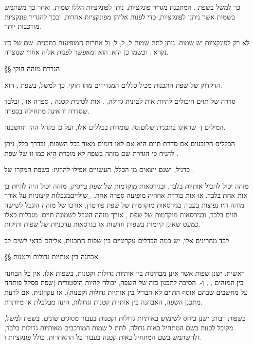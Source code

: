 כך למשל בשפת , המתכנת מגדיר פונקציות, נותן לפונקציות הללו שמות, ואחר כך
משתמש בשמות אשר ניתנו לפונקציות, כדי לפנות אליהן מפונקציות אחרות, ובכך להגדיר
פונקציות מורכבות יותר.

לא רק לפונקציות יש שמות. ניתן לתת שמות ל, ל,
ל, ול
אחרות המופיעות בתכנית. שם של  כזו נקרא .
ו כשמו כן הוא: הוא   ומאפשר לפנות אליה אחרי
שנוצרה.

§§ הגדרת מזהה חוקי

הדקדוק של שפת התכנות מכיל כללים המגדירים מהו  חוקי.
כך למשל, בשפת ,  הוא:

\begin{מובאה}
סדרה של תוים היכולים להיות אות לטינית גדולה, ,
אות לטינית קטנה , ספרה  או
,
ובלבד שסדרה זו אינה מתחילה בספרה.
\end{מובאה}

המילים  וְ- שראינו ב תכנית שלום:סי, עומדות בכללים אלו,
ועל כן בקהל ה הן תחשבנה.

הכללים הקובעים אם סדרת תוים היא  אם לאו דומים מאוד בכל השפות,
ובדרך כלל, ניתן להניח כי הגדרת שם מזהה בשפה לא מוכרת היא כמו זו של שפת .

כרגיל, ישנם יוצאים מן הכלל, העשויים אפילו להרגיז: בשפת המקרו של
\LR{\TeX}.

 מזהה יכול להכיל אותיות בלבד, ובגירסאות מוקדמות של שפת בייסיק, מזהה יכול היה
 להיות בן אות אחת בלבד, או אות בודדת אחריה מופיעה ספרה אחת.%
␣שוליים{מגבלות
  קיצוניות על אורך מזהה היו נפוצות בעבר: בגירסאות מוקדמות של שפת פורטרן, אורכו של
  מזהה הוגבל לשישה תוים בלבד, ובגירסאות מוקדמות של שפת , אורך מזהה הוגבל
  לשמונה תוים. מגבלות כאלו כמעט שאינן קיימות בשפות חדשות או בגרסאות עדכניות של
שפות ותיקות.}

לבד מחריגים אלו, יש כמה הבדלים עקרוניים בין שפות התכנות, אליהם כדאי לשים לב.

§§ אבחנה בין אותיות גדולות וקטנות

ראשית, ישנן שפות אשר אינן מבחינות בין אותיות גדולות וקטנות, בשפות אלו, אין כל
הבחנה בין המזהים , , וְ-. הסיבה לתכנון כזה של
השפה, יכולה להיות היסטורית (שפת פסקל פותחה על מחשבים שבהם אוסף התוים לא הבדיל
בין אותיות גדולות וקטנות), או עקרונית, אם לדעת מתכנן השפה, האבחנה בין אותיות
קטנות וגדולות, הינה מבלבלת או מיותרת.

בשפות רבות, ישנן  ביחס לשימוש באותיות גדולות וקטנות בעבור  מסוגים
שונים. בשפת  למשל, מקובל לכנות  בשם המתחיל באות גדולה, לתת ל
שמות המורכבים מאותיות גדולות בלבד, ולהשתמש בשם המתחיל באות קטנה בעבור
כל ה האחרות, כולל פונקציות ו.

